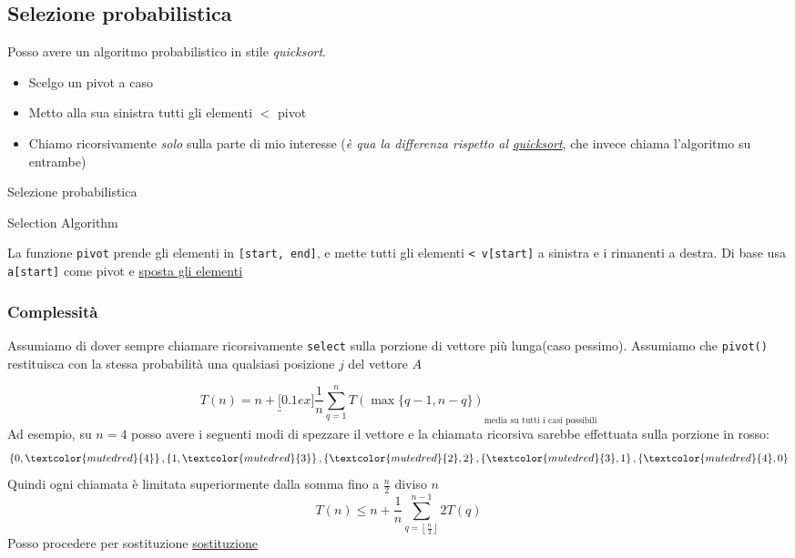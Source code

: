 \subsection{Selezione probabilistica}
Posso avere un algoritmo probabilistico in stile \textit{quicksort}.
\begin{itemize}
	\item Scelgo un pivot a caso
	\item Metto alla sua sinistra tutti gli elementi $ < $ pivot
	\item Chiamo ricorsivamente \textit{solo} sulla parte di mio interesse (\textit{è qua la differenza rispetto al \hyperref[quicksort]{quicksort}}, che invece chiama l'algoritmo su entrambe)
\end{itemize}
\begin{algoritmo}{Selezione probabilistica}
	\begin{algorithm}[H]
		\caption{Selection Algorithm}
	\end{algorithm}
\end{algoritmo}
La funzione \verb|pivot| prende gli elementi in \verb|[start, end]|, e mette tutti gli elementi \verb|< v[start]| a sinistra e i rimanenti a destra. Di base usa \verb|a[start]| come pivot e \underline{sposta gli elementi}
\subsubsection{Complessità}
Assumiamo di dover sempre chiamare ricorsivamente \verb|select| sulla porzione di vettore più lunga(caso pessimo).
Assumiamo che \verb|pivot()| restituisca con la stessa probabilità una qualsiasi posizione $j$ del vettore $A$

\[
	T(n)=n+\underbracket[0.1ex]{\frac{1}{n} \sum_{q=1}^n T(\max \{q-1, n-q\})}_{\text{media su tutti i casi possibili}}
\]
Ad esempio, su $ n = 4 $ posso avere i seguenti modi di spezzare il vettore e la chiamata ricorsiva sarebbe effettuata sulla porzione in rosso:
\[
	\left\{0,\textcolor{mutedred}{4}\right\}, \left\{1,\textcolor{mutedred}{3}\right\}, \left\{\textcolor{mutedred}{2},2\right\}, \left\{\textcolor{mutedred}{3},1\right\}, \left\{\textcolor{mutedred}{4},0\right\}
\]
Quindi ogni chiamata è limitata superiormente dalla somma fino a $ \frac{n}{2} $ diviso $ n $
\[
	T\left(n\right) \le n + \frac{1}{n} \sum_{q = \left\lfloor \frac{n}{2} \right\rfloor}^{n-1} 2T\left(q\right)
\]
Posso procedere per sostituzione  \hyperref[complessita per sostituzione]{sostituzione}
\vskip3mm

